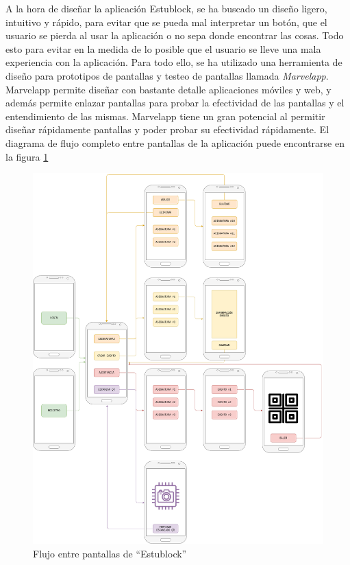 A la hora de diseñar la aplicación Estublock, se ha buscado un diseño ligero, intuitivo y rápido, para evitar que se pueda mal interpretar un botón, que el usuario se pierda al usar la aplicación o no sepa donde encontrar las cosas. Todo esto para evitar en la medida de lo posible que el usuario se lleve una mala experiencia con la aplicación. Para todo ello, se ha utilizado una herramienta de diseño para prototipos de pantallas y testeo de pantallas llamada \emph{Marvelapp}\cite{marvelapp}. Marvelapp permite diseñar con bastante detalle aplicaciones móviles y web, y además permite enlazar pantallas para probar la efectividad de las pantallas y el entendimiento de las mismas. Marvelapp tiene un gran potencial al permitir diseñar rápidamente pantallas y poder probar su efectividad rápidamente. El diagrama de flujo completo entre pantallas de la aplicación puede encontrarse en la figura \ref{fig:diagramaCompleto}\\

\begin{figure}[h!]
  \centering
  \includegraphics[width=1\linewidth]{figs/Desarrollo/Interfaz/diagrama_completo}
  \caption[Flujo entre pantallas de ``Estublock'']{Flujo entre pantallas de ``Estublock''}
  \label{fig:diagramaCompleto}
\end{figure}

